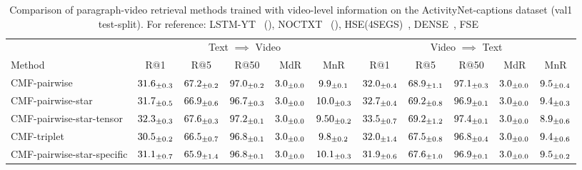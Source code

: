 \begin{table*}[h]
\centering 
\footnotesize 
\setlength{\tabcolsep}{5pt}
\begin{tabular}{l | c c c c c | c c c c c} 
\hline \hline 
\multicolumn{1}{c}{} & 
\multicolumn{5}{c}{Text $\implies$ Video} & \multicolumn{5}{c}{Video $\implies$ Text} \\
Method & R$@$1 & R$@$5 & R$@$50 & MdR & MnR & R$@$1 & R$@$5 & R$@$50 & MdR & MnR \\ 

\hline
CMF-pairwise & $ 31.6_{\pm0.3}$ & $ 67.2_{\pm0.2}$ & $ 97.0_{\pm0.2}$ & $ 3.0_{\pm0.0}$ & $ 9.9_{\pm0.1}$ & $ 32.0_{\pm0.4}$ & $ 68.9_{\pm1.1}$ & $ 97.1_{\pm0.3}$ & $ 3.0_{\pm0.0}$ & $ 9.5_{\pm0.4}$ \\
CMF-pairwise-star & $ 31.7_{\pm0.5}$ & $ 66.9_{\pm0.6}$ & $ 96.7_{\pm0.3}$ & $ 3.0_{\pm0.0}$ & $ 10.0_{\pm0.3}$ & $ 32.7_{\pm0.4}$ & $ 69.2_{\pm0.8}$ & $ 96.9_{\pm0.1}$ & $ 3.0_{\pm0.0}$ & $ 9.4_{\pm0.3}$ \\
CMF-pairwise-star-tensor & $ 32.3_{\pm0.3}$ & $ 67.6_{\pm0.3}$ & $ 97.2_{\pm0.1}$ & $ 3.0_{\pm0.0}$ & $ 9.50_{\pm0.2}$ & $ 33.5_{\pm0.7}$ & $ 69.2_{\pm1.2}$ & $ 97.4_{\pm0.1}$ & $ 3.0_{\pm0.0}$ & $ 8.9_{\pm0.6}$ \\
CMF-triplet & $ 30.5_{\pm0.2}$ & $ 66.5_{\pm0.7}$ & $ 96.8_{\pm0.1}$ & $ 3.0_{\pm0.0}$ & $ 9.8_{\pm0.2}$ & $ 32.0_{\pm1.4}$ & $ 67.5_{\pm0.8}$ & $ 96.8_{\pm0.4}$ & $ 3.0_{\pm0.0}$ & $ 9.4_{\pm0.6}$ \\
CMF-pairwise-star-specific & $ 31.1_{\pm0.7}$ & $ 65.9_{\pm1.4}$ & $ 96.8_{\pm0.1}$ & $ 3.0_{\pm0.0}$ & $ 10.1_{\pm0.3}$ & $ 31.9_{\pm0.6}$ & $ 67.6_{\pm1.0}$ & $ 96.9_{\pm0.1}$ & $ 3.0_{\pm0.0}$ & $ 9.5_{\pm0.2}$ \\

\hline \hline
\end{tabular}
\caption{\color{red}Comparison of paragraph-video retrieval methods trained with video-level information on the ActivityNet-captions dataset (val1 test-split). For reference: LSTM-YT~\cite{venugopalan2015sequence} (\cite{zhang2018cross}), NOCTXT~\cite{venugopalan2014translating} (\cite{zhang2018cross}), HSE(4SEGS)~\cite{zhang2018cross}, DENSE~\cite{krishna2017dense}, FSE~\cite{zhang2018cross} \color{black}}
\label{table:activity-net} 
\end{table*}
